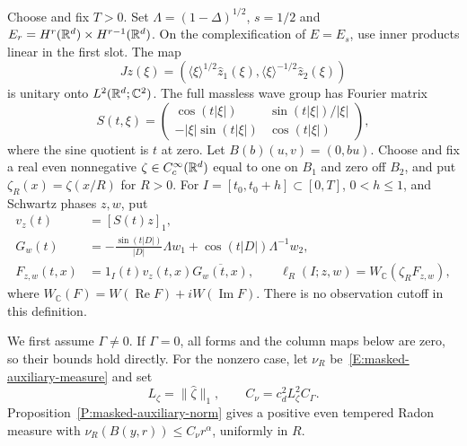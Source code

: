 Choose and fix $T > 0$. Set $\Lambda = (1-\Delta)^{1/2}$, $s = 1/2$ and $E_r =
H^r(\mathbb{R}^d)\times H^{r-1}(\mathbb{R}^d)$. On the complexification of $E = E_s$, use inner
products linear in the first slot. The map
\[
  Jz(\xi) = \left(\langle\xi\rangle^{1/2}\widehat{z}_1(\xi),
  \langle\xi\rangle^{-1/2}\widehat{z}_2(\xi)\right)
\]
is unitary onto $L^2(\mathbb{R}^d;\mathbb{C}^2)$. The full massless wave group has
Fourier matrix
\begin{equation}\label{E:variance-free-matrix}
  S(t,\xi) =
  \begin{pmatrix}
    \cos(t|\xi|) & \sin(t|\xi|)/|\xi|\\
    -|\xi|\sin(t|\xi|) & \cos(t|\xi|)
  \end{pmatrix},
\end{equation}
where the sine quotient is $t$ at zero. Let $B(b)(u,v) = (0,bu)$. Choose and fix
a real even nonnegative $\zeta \in C_c^\infty(\mathbb{R}^d)$ equal to one on $B_1$ and
zero off $B_2$, and put $\zeta_R(x) = \zeta(x/R)$ for $R > 0$. For $I =
[t_0,t_0+h] \subset [0,T]$, $0 < h \le 1$, and Schwartz phases $z,w$, put
\begin{align}
  v_z(t) &= [S(t)z]_1,
  \label{E:variance-displacement}\\
  G_w(t) &= -\frac{\sin(t|D|)}{|D|}\Lambda w_1
  +\cos(t|D|)\Lambda^{-1}w_2,
  \label{E:variance-dual-wave}\\
  F_{z,w}(t,x) &= 1_I(t)v_z(t,x)\overline{G_w(t,x)},
  \qquad \ell_R(I;z,w) = W_{\mathbb{C}}(\zeta_RF_{z,w}),
  \label{E:variance-actual-form}
\end{align}
where $W_{\mathbb{C}}(F) = W(\operatorname{Re}F)+iW(\operatorname{Im}F)$. There
is no observation cutoff in this definition.

We first assume $\Gamma \ne 0$. If $\Gamma = 0$, all forms and the column maps
below are zero, so their bounds hold directly. For the nonzero case, let $\nu_R$
be~\eqref{E:masked-auxiliary-measure} and set
\begin{equation}\label{E:variance-actual-growth-constant}
  L_\zeta = \|\widehat{\zeta}\|_1,\qquad
  C_\nu = c_d^2L_\zeta^2C_\Gamma.
\end{equation}
Proposition~\ref{P:masked-auxiliary-norm} gives a positive even tempered Radon
measure with $\nu_R(B(y,r)) \le C_\nu r^\alpha$, uniformly in $R$.

